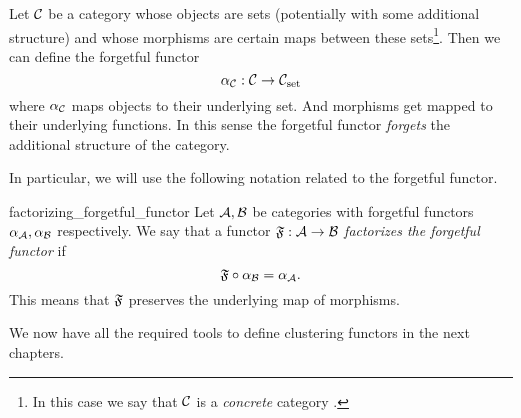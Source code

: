 \begin{definition}{\cite[Chapter~1~Example~10]{Roman2017}}{}
Let $\mathcal{C}$ be a category whose objects are sets (potentially with some additional structure) and whose morphisms are certain maps between these sets\footnote{In this case we say that $\mathcal{C}$ is a \emph{concrete} category \cite[p.~11]{Roman2017}.}. Then we can define the forgetful functor
$$
\alpha_{\mathcal{C}}: \mathcal{C} \to \mathcal{C}_\mathrm{set}
$$
where $\alpha_{\mathcal{C}}$ maps objects to their underlying set. And morphisms get mapped to their underlying functions. In this sense the forgetful functor \emph{forgets} the additional structure of the category.
\end{definition}

In particular, we will use the following notation related to the forgetful functor.

\begin{notation}{}{factorizing_forgetful_functor}
Let $\mathcal{A}, \mathcal{B}$ be categories with forgetful functors $\alpha_{\mathcal{A}}, \alpha_{\mathcal{B}}$ respectively. We say that a functor $\mathfrak{F}: \mathcal{A} \to \mathcal{B}$ \emph{factorizes the forgetful functor} if
\begin{equation*}
    \mathfrak{F} \circ \alpha_{\mathcal{B}} = \alpha_{\mathcal{A}}.
\end{equation*}
This means that $\mathfrak{F}$ preserves the underlying map of morphisms.
\end{notation}

\medskip We now have all the required tools to define clustering functors in the next chapters.